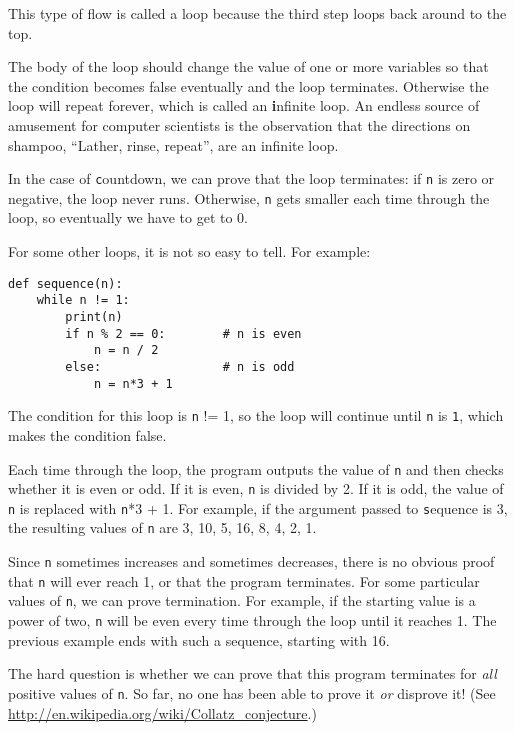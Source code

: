 \documentclass[
DIV=11,
fontsize=12,
twoside,
headinclude=false,
titlepage=firstiscover,
abstract=true,
headsepline=true,
footsepline=true,
chapterprefix=true, %
headings=big,
bibliography=totoc,%
captions=tableheading
]{scrbook}
\theoremstyle{definition}
\begin{document}
This type of flow is called a loop because the third step
loops back around to the top.  

The body of the loop should change the value of one or more variables
so that the condition becomes false eventually and the loop
terminates.  Otherwise the loop will repeat forever, which is called
an {\textbf infinite loop}.  An endless source of amusement for computer
scientists is the observation that the directions on shampoo,
``Lather, rinse, repeat'', are an infinite loop.

In the case of {\texttt countdown}, we can prove that the loop
terminates: if {\texttt n} is zero or negative, the loop never runs.
Otherwise, {\texttt n} gets smaller each time through the
loop, so eventually we have to get to 0.

For some other loops, it is not so easy to tell.  For example:

\begin{lstlisting}
def sequence(n):
    while n != 1:
        print(n)
        if n % 2 == 0:        # n is even
            n = n / 2
        else:                 # n is odd
            n = n*3 + 1
\end{lstlisting}
%
The condition for this loop is {\texttt n != 1}, so the loop will continue
until {\texttt n} is {\texttt 1}, which makes the condition false.

Each time through the loop, the program outputs the value of {\texttt n}
and then checks whether it is even or odd.  If it is even, {\texttt n} is
divided by 2.  If it is odd, the value of {\texttt n} is replaced with
{\texttt n*3 + 1}. For example, if the argument passed to {\texttt sequence}
is 3, the resulting values of {\texttt n} are 3, 10, 5, 16, 8, 4, 2, 1.

Since {\texttt n} sometimes increases and sometimes decreases, there is no
obvious proof that {\texttt n} will ever reach 1, or that the program
terminates.  For some particular values of {\texttt n}, we can prove
termination.  For example, if the starting value is a power of two,
{\texttt n} will be even every time through the loop
until it reaches 1. The previous example ends with such a sequence,
starting with 16.

The hard question is whether we can prove that this program terminates
for {\em all} positive values of {\texttt n}.  So far, no one has
been able to prove it {\em or} disprove it!  (See
  \url{http://en.wikipedia.org/wiki/Collatz_conjecture}.)
\end{document}
